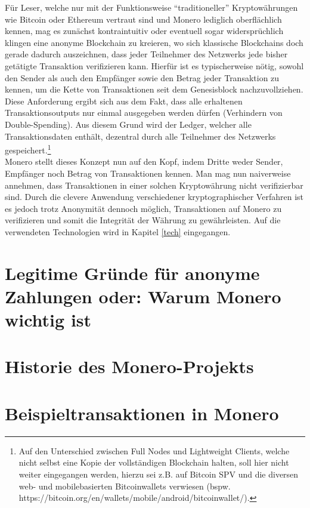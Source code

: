 Für Leser, welche nur mit der Funktionsweise ``traditioneller'' Kryptowährungen wie Bitcoin oder Ethereum vertraut sind und Monero lediglich oberflächlich kennen, 
mag es zunächst kontraintuitiv oder eventuell sogar widersprüchlich klingen eine anonyme Blockchain zu kreieren, wo sich klassische Blockchains doch gerade dadurch auszeichnen,
dass jeder Teilnehmer des Netzwerks jede bisher getätigte Transaktion verifizieren kann. Hierfür ist es typischerweise nötig, sowohl den Sender als auch den Empfänger sowie
den Betrag jeder Transaktion zu kennen, um die Kette von Transaktionen seit dem Genesisblock nachzuvollziehen. Diese Anforderung ergibt sich aus dem Fakt, dass alle erhaltenen Transaktionsoutputs nur einmal
ausgegeben werden dürfen (Verhindern von Double-Spending). Aus diesem Grund wird der Ledger, welcher alle Transaktionsdaten enthält,
dezentral durch alle Teilnehmer des Netzwerks gespeichert.\footnote{Auf den Unterschied zwischen Full Nodes und Lightweight Clients, welche nicht selbst eine Kopie der vollständigen
Blockchain halten, soll hier nicht weiter eingegangen werden, hierzu sei z.B. auf Bitcoin SPV und die diversen web- und mobilebasierten Bitcoinwallets verwiesen (bspw. https://bitcoin.org/en/wallets/mobile/android/bitcoinwallet/). }\\

Monero stellt dieses Konzept nun auf den Kopf, indem Dritte weder Sender, Empfänger noch Betrag von Transaktionen kennen. Man mag nun naiverweise annehmen, dass Transaktionen
in einer solchen Kryptowährung nicht verifizierbar sind. Durch die clevere Anwendung verschiedener kryptographischer Verfahren ist es jedoch trotz Anonymität dennoch möglich, Transaktionen
auf Monero zu verifizieren und somit die Integrität der Währung zu gewährleisten. Auf die verwendeten Technologien wird in Kapitel \ref{tech} eingegangen.

\chapter{Legitime Gründe für anonyme Zahlungen oder: Warum Monero wichtig ist} \label {reasons}

\chapter{Historie des Monero-Projekts}

\chapter{Beispieltransaktionen in Monero}

